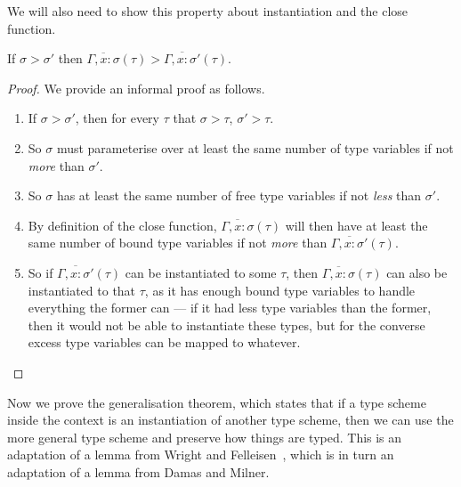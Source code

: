 We will also need to show this property about instantiation and the
close function.
\begin{lemma}\label{lem:close>}
  If $\sigma > \sigma'$ then $\overline{\Gamma , x : \sigma}(\tau) > \overline{\Gamma, x : \sigma'}(\tau)$.
\end{lemma}
\begin{proof}
  We provide an informal proof as follows.
  \begin{enumerate}
  \item If $\sigma > \sigma'$, then for every $\tau$ that $\sigma > \tau$, $\sigma' > \tau$.
  \item So $\sigma$ must parameterise over at least the same number of type
    variables if not \textit{more} than $\sigma'$.
  \item So $\sigma$ has at least the same number of free type variables if
    not \textit{less} than $\sigma'$.
  \item By definition of the close function,
    $\overline{\Gamma, x : \sigma}(\tau)$ will then have at least the same number
    of bound type variables if not \textit{more} than
    $\overline{\Gamma, x : \sigma'}(\tau)$.
  \item So if $\overline{\Gamma, x : \sigma'}(\tau)$ can be instantiated to some
    $\tau$, then $\overline{\Gamma, x : \sigma}(\tau)$ can also be instantiated to
    that $\tau$, as it has enough bound type variables to handle
    everything the former can --- if it had less type variables than the
    former, then it would not be able to instantiate these types, but
    for the converse excess type variables can be mapped to whatever.
  \end{enumerate}
\end{proof}

Now we prove the generalisation theorem, which states that if a type
scheme inside the context is an instantiation of another type scheme,
then we can use the more general type scheme and preserve how things
are typed. This is an adaptation of a lemma from Wright and
Felleisen~\cite[Lemma 4.6]{wright1994}, which is in turn an
adaptation of a lemma from Damas and Milner.

